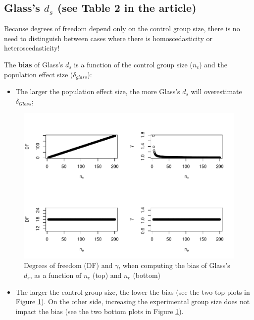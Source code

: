 \documentclass[
  man]{apa6}
\providecommand{\tightlist}{%
  \setlength{\itemsep}{0pt}\setlength{\parskip}{0pt}}
\begin{document}
\hypertarget{glasss-d_s-see-table-2-in-the-article}{%
\subsection{\texorpdfstring{Glass's \(d_s\) (see Table 2 in the article)}{Glass's d\_s (see Table 2 in the article)}}\label{glasss-d_s-see-table-2-in-the-article}}

Because degrees of freedom depend only on the control group size, there is no need to distinguish between cases where there is homoscedasticity or heteroscedasticity!

The \textbf{bias} of Glass's \(d_s\) is a function of the control group size (\(n_c\)) and the population effect size (\(\delta_{glass}\)):

\begin{itemize}
\tightlist
\item
  The larger the population effect size, the more Glass's \(d_s\) will overestimate \(\delta_{Glass}\);
\end{itemize}

\begin{figure}
\centering
\includegraphics{Theoretical-Bias-of-all-estimators-as-a-function-of-population-parameters_files/figure-latex/biasGlassctrlsize2-1.pdf}
\caption{\label{fig:biasGlassctrlsize2}Degrees of freedom (DF) and \(\gamma\), when computing the bias of Glass's \(d_s\), as a function of \(n_c\) (top) and \(n_e\) (bottom)}
\end{figure}

\begin{itemize}
\tightlist
\item
  The larger the control group size, the lower the bias (see the two top plots in Figure \ref{fig:biasGlassctrlsize2}). On the other side, increasing the experimental group size does not impact the bias (see the two bottom plots in Figure \ref{fig:biasGlassctrlsize2}).
\end{itemize}
\end{document}
